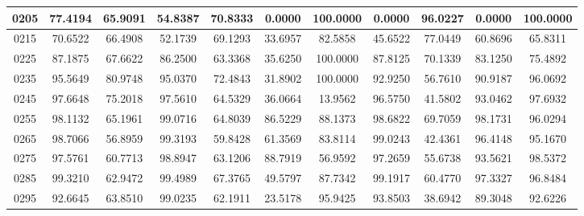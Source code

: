\begin{appendices}
\begin{table}
\begin{tabular}{ |c|c|c|c|c|c|c|c|c|c|c| }
\hline
0205 &  77.4194 &  65.9091 &   54.8387 &  70.8333 &   0.0000 &  100.0000 &   0.0000 &  96.0227 &   0.0000 &  100.0000    \\
\hline
0215 &  70.6522 &  66.4908 &   52.1739 &  69.1293 &   33.6957 &  82.5858 &   45.6522 &  77.0449 &   60.8696 &  65.8311    \\
\hline
0225 &  87.1875 &  67.6622 &   86.2500 &  63.3368 &   35.6250 &  100.0000 &   87.8125 &  70.1339 &   83.1250 &  75.4892    \\
\hline
0235 &  95.5649 &  80.9748 &   95.0370 &  72.4843 &   31.8902 &  100.0000 &   92.9250 &  56.7610 &   90.9187 &  96.0692    \\
\hline
0245 &  97.6648 &  75.2018 &   97.5610 &  64.5329 &   36.0664 &  13.9562 &   96.5750 &  41.5802 &   93.0462 &  97.6932    \\
\hline
0255 &  98.1132 &  65.1961 &   99.0716 &  64.8039 &   86.5229 &  88.1373 &   98.6822 &  69.7059 &   98.1731 &  96.0294    \\
\hline
0265 &  98.7066 &  56.8959 &   99.3193 &  59.8428 &   61.3569 &  83.8114 &   99.0243 &  42.4361 &   96.4148 &  95.1670    \\
\hline
0275 &  97.5761 &  60.7713 &   98.8947 &  63.1206 &   88.7919 &  56.9592 &   97.2659 &  55.6738 &   93.5621 &  98.5372    \\
\hline
0285 &  99.3210 &  62.9472 &   99.4989 &  67.3765 &   49.5797 &  87.7342 &   99.1917 &  60.4770 &   97.3327 &  96.8484    \\
\hline
0295 &  92.6645 &  63.8510 &   99.0235 &  62.1911 &   23.5178 &  95.9425 &   93.8503 &  38.6942 &   89.3048 &  92.6226    \\
\hline
\end{tabular}

\end{table}


\end{appendices}
